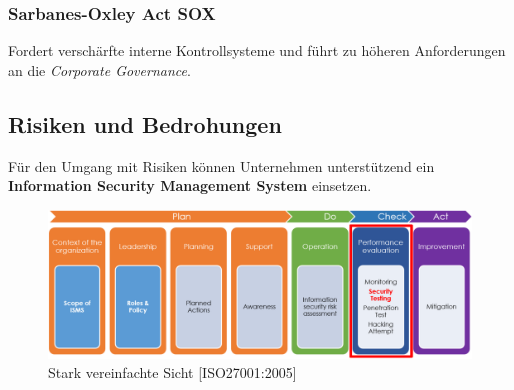 \subsubsection{Sarbanes-Oxley Act SOX}
Fordert verschärfte interne Kontrollsysteme und führt zu höheren Anforderungen an die \textit{Corporate Governance}.

\subsection{Risiken und Bedrohungen}

Für den Umgang mit Risiken können Unternehmen unterstützend ein \textbf{Information Security Management System} einsetzen.

\begin{figure}[H]
	\includegraphics[width=\textwidth]{./img/ISO27001_overview}
	\caption{Stark vereinfachte Sicht [ISO27001:2005]}
\end{figure}

